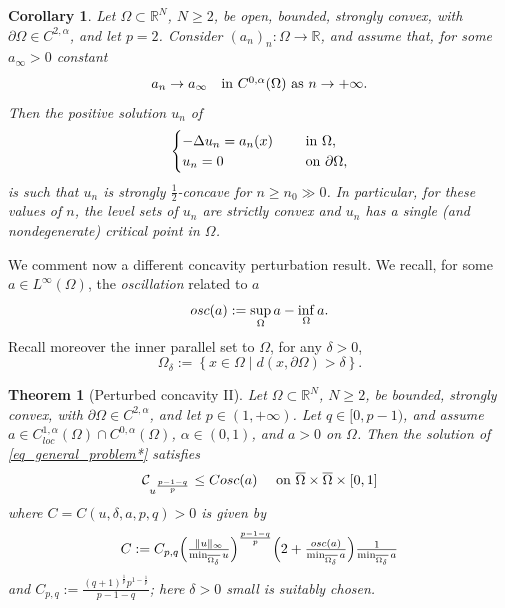 \documentclass[11pt, reqno]{amsart}
\newtheorem{corollary}[lemma]{Corollary}
\newtheorem{theorem}[lemma]{Theorem}
\theoremstyle{definition}
\numberwithin{equation}{section}
\newcommand{\R}{\mathbb{R}}
\newcommand{\mc}[1]{\mathcal{#1}}
\newcommand{\osc}{{\rm osc}}
\def\norm#1{\|#1\|}
\begin{document}
\begin{corollary}
\label{cor_strict_conc_const}
Let $\Omega \subset \R^N$, $N\geq 2$, be open, bounded, strongly convex, with $\partial \Omega \in C^{2,\alpha}$, and let $p=2$. 
Consider $(a_n)_n : \Omega \to \R$, and assume that, for some $a_{\infty}>0$ constant
$$a_n\to a_{\infty} \quad \hbox{in $C^{0,\alpha}(\Omega)$ as $n \to +\infty$}.$$
Then the positive solution $u_n$ of 
\begin{equation}\label{eq_intr_a_n_conv}
\begin{cases}
-\Delta u_n = a_n(x) & \quad \hbox{ in $\Omega$},\\ 
u_n =0 & \quad \hbox{ on $\partial \Omega$},
\end{cases}
\end{equation}
is such that $u_n$ is strongly $\frac{1}{2}$-concave for $n \geq n_0 \gg 0$. In particular, for these values of $n$, the level sets of $u_n$ are strictly convex and $u_n$ has a single (and nondegenerate) critical point in $\Omega$.
\end{corollary}

We comment now a different concavity perturbation result.
We recall, for some $a \in L^{\infty}(\Omega)$, the \emph{oscillation} related to $a$
$$\textup{osc}(a):=\sup_{\Omega} a - \inf_{\Omega} a.$$
Recall moreover the inner parallel set to $\Omega$, for any $\delta>0$,
$$\Omega_{\delta}:= \left\{ x \in \Omega \mid d(x,\partial \Omega) >\delta\right\}.$$

\begin{theorem}[Perturbed concavity II]
\label{thm_approx_concav_harmonic}
Let $\Omega \subset \R^N$, $N\geq 2$, be bounded, strongly convex, with $\partial \Omega \in C^{2,\alpha}$, and let $p\in (1,+\infty)$.
Let $q \in [0,p-1)$, and assume $a \in C^{1,\alpha}_{loc}(\Omega) \cap C^{0,\alpha}(\Omega)$, $\alpha \in (0,1)$, and $a>0$ on $\Omega$. 
Then the solution of \eqref{eq_general_problem*} satisfies 
$$\mc{C}_{u^{ \frac{p-1 - q}{p}}} \leq C \textup{osc}(a) \quad \hbox{ on $ \overline{\Omega} \times \overline{\Omega} \times [0,1]$}$$
where $C=C(u,\delta,a,p,q)>0$ is given by 
\begin{equation}\label{eq_constant_C}
C: = C_{p,q} \Big( \tfrac{ \norm{u}_{\infty}}{\min_{\overline{\Omega_{\delta}}} u}\Big)^{\frac{p-1-q}{p}} \Big( 2 + \tfrac{\osc(a)}{\min_{\overline{\Omega_{\delta}}} a}\Big) \tfrac{1}{ \min_{\overline{\Omega_{\delta}}} a} 
\end{equation}
and $C_{p,q}:=\frac{(q+1)^{\frac{1}{p}}p^{1-\frac{1}{p}} }{p-1-q}$; here $\delta>0$ small is suitably chosen.
\end{theorem}
\end{document}
